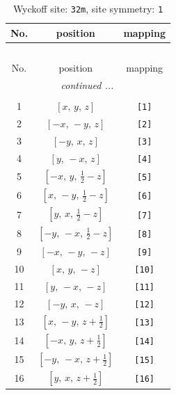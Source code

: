 \documentclass[fleqn,8pt]{jsarticle}
\begin{document}
\begin{longtable}{ccc}
\caption{Wyckoff site: {\tt 32m}, site symmetry: {\tt 1}}
 \\
 \hline \hline
No. & position & mapping \\ \hline \endfirsthead

\multicolumn{2}{l}{\tablename\ \thetable{}} \\
 \hline \hline
No. & position & mapping \\ \hline \endhead

 \hline \hline
\multicolumn{2}{r}{\footnotesize\it continued ...} \\ \endfoot

 \hline \hline
\multicolumn{2}{r}{} \\ \endlastfoot

1 & $\left[ x,\, y,\, z \right]$ & {\tt [1]} \\ \hline
2 & $\left[ - x,\, - y,\, z \right]$ & {\tt [2]} \\ \hline
3 & $\left[ - y,\, x,\, z \right]$ & {\tt [3]} \\ \hline
4 & $\left[ y,\, - x,\, z \right]$ & {\tt [4]} \\ \hline
5 & $\left[ - x,\, y,\, \frac{1}{2} - z \right]$ & {\tt [5]} \\ \hline
6 & $\left[ x,\, - y,\, \frac{1}{2} - z \right]$ & {\tt [6]} \\ \hline
7 & $\left[ y,\, x,\, \frac{1}{2} - z \right]$ & {\tt [7]} \\ \hline
8 & $\left[ - y,\, - x,\, \frac{1}{2} - z \right]$ & {\tt [8]} \\ \hline
9 & $\left[ - x,\, - y,\, - z \right]$ & {\tt [9]} \\ \hline
10 & $\left[ x,\, y,\, - z \right]$ & {\tt [10]} \\ \hline
11 & $\left[ y,\, - x,\, - z \right]$ & {\tt [11]} \\ \hline
12 & $\left[ - y,\, x,\, - z \right]$ & {\tt [12]} \\ \hline
13 & $\left[ x,\, - y,\, z + \frac{1}{2} \right]$ & {\tt [13]} \\ \hline
14 & $\left[ - x,\, y,\, z + \frac{1}{2} \right]$ & {\tt [14]} \\ \hline
15 & $\left[ - y,\, - x,\, z + \frac{1}{2} \right]$ & {\tt [15]} \\ \hline
16 & $\left[ y,\, x,\, z + \frac{1}{2} \right]$ & {\tt [16]} \\
\end{longtable}
\end{document}
